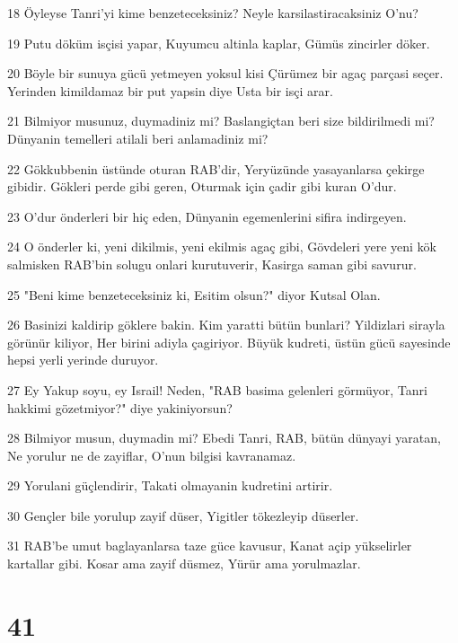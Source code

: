 \par 18 Öyleyse Tanri'yi kime benzeteceksiniz? Neyle karsilastiracaksiniz O'nu?
\par 19 Putu döküm isçisi yapar, Kuyumcu altinla kaplar, Gümüs zincirler döker.
\par 20 Böyle bir sunuya gücü yetmeyen yoksul kisi Çürümez bir agaç parçasi seçer. Yerinden kimildamaz bir put yapsin diye Usta bir isçi arar.
\par 21 Bilmiyor musunuz, duymadiniz mi? Baslangiçtan beri size bildirilmedi mi? Dünyanin temelleri atilali beri anlamadiniz mi?
\par 22 Gökkubbenin üstünde oturan RAB'dir, Yeryüzünde yasayanlarsa çekirge gibidir. Gökleri perde gibi geren, Oturmak için çadir gibi kuran O'dur.
\par 23 O'dur önderleri bir hiç eden, Dünyanin egemenlerini sifira indirgeyen.
\par 24 O önderler ki, yeni dikilmis, yeni ekilmis agaç gibi, Gövdeleri yere yeni kök salmisken RAB'bin solugu onlari kurutuverir, Kasirga saman gibi savurur.
\par 25 "Beni kime benzeteceksiniz ki, Esitim olsun?" diyor Kutsal Olan.
\par 26 Basinizi kaldirip göklere bakin. Kim yaratti bütün bunlari? Yildizlari sirayla görünür kiliyor, Her birini adiyla çagiriyor. Büyük kudreti, üstün gücü sayesinde hepsi yerli yerinde duruyor.
\par 27 Ey Yakup soyu, ey Israil! Neden, "RAB basima gelenleri görmüyor, Tanri hakkimi gözetmiyor?" diye yakiniyorsun?
\par 28 Bilmiyor musun, duymadin mi? Ebedi Tanri, RAB, bütün dünyayi yaratan, Ne yorulur ne de zayiflar, O'nun bilgisi kavranamaz.
\par 29 Yorulani güçlendirir, Takati olmayanin kudretini artirir.
\par 30 Gençler bile yorulup zayif düser, Yigitler tökezleyip düserler.
\par 31 RAB'be umut baglayanlarsa taze güce kavusur, Kanat açip yükselirler kartallar gibi. Kosar ama zayif düsmez, Yürür ama yorulmazlar.

\chapter{41}

